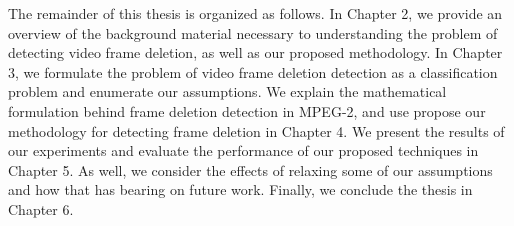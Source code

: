 The remainder of this thesis is organized as follows. In Chapter 2, we provide an overview of the background material necessary to understanding the problem of detecting video frame deletion, as well as our proposed methodology. In Chapter 3, we formulate the problem of video frame deletion detection as a classification problem and enumerate our assumptions. We explain the mathematical formulation behind frame deletion detection in MPEG-2, and use propose our methodology for detecting frame deletion in Chapter 4. We present the results of our experiments and evaluate the performance of our proposed techniques in Chapter 5. As well, we consider the effects of relaxing some of our assumptions and how that has bearing on future work. Finally, we conclude the thesis in Chapter 6.